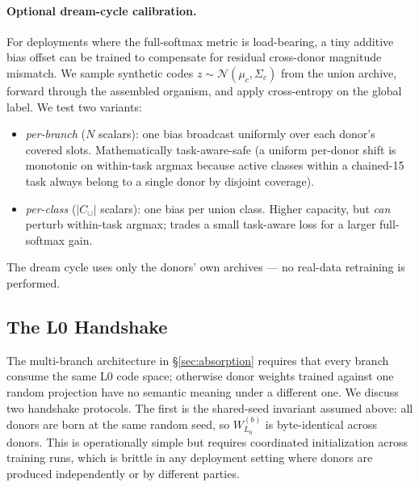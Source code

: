 \documentclass[11pt]{article}
\begin{document}
\paragraph{Optional dream-cycle calibration.}
For deployments where the full-softmax metric is load-bearing, a tiny
additive bias offset can be trained to compensate for residual
cross-donor magnitude mismatch. We sample synthetic codes
$z \sim \mathcal{N}(\mu_c, \Sigma_c)$ from the union archive, forward
through the assembled organism, and apply cross-entropy on the global
label. We test two variants:
\begin{itemize}[leftmargin=1.5em]
  \item \emph{per-branch} ($N$ scalars): one bias broadcast uniformly
        over each donor's covered slots. Mathematically task-aware-safe
        (a uniform per-donor shift is monotonic on within-task argmax
        because active classes within a chained-15 task always belong
        to a single donor by disjoint coverage).
  \item \emph{per-class} ($|C_{\cup}|$ scalars): one bias per union
        class. Higher capacity, but \emph{can} perturb within-task
        argmax; trades a small task-aware loss for a larger
        full-softmax gain.
\end{itemize}
The dream cycle uses only the donors' own archives --- no real-data
retraining is performed.

\subsection{The L0 Handshake}
\label{sec:l0-handshake}\label{app:l0-handshake}

The multi-branch architecture in \S\ref{sec:absorption} requires that
every branch consume the same L0 code space; otherwise donor weights
trained against one random projection have no semantic meaning under a
different one. We discuss two handshake protocols. The first is the
shared-seed invariant assumed above: all donors are born at the same
random seed, so $W_{L_0}^{(b)}$ is byte-identical across donors. This
is operationally simple but requires coordinated initialization across
training runs, which is brittle in any deployment setting where donors
are produced independently or by different parties.
\end{document}
